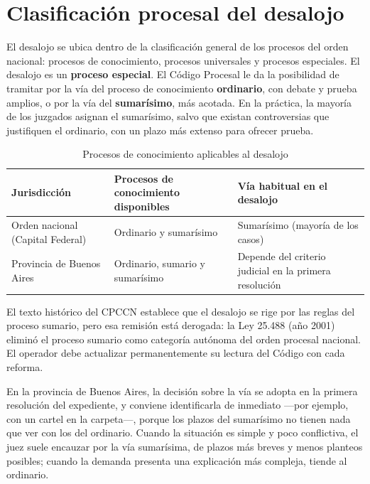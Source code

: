 \documentclass[12pt,oneside]{book}
\begin{document}
\section{Clasificación procesal del desalojo}

El desalojo se ubica dentro de la clasificación general de los procesos del orden nacional: procesos de conocimiento, procesos universales y procesos especiales. El desalojo es un \textbf{proceso especial}. El Código Procesal le da la posibilidad de tramitar por la vía del proceso de conocimiento \textbf{ordinario}, con debate y prueba amplios, o por la vía del \textbf{sumarísimo}, más acotada. En la práctica, la mayoría de los juzgados asignan el sumarísimo, salvo que existan controversias que justifiquen el ordinario, con un plazo más extenso para ofrecer prueba.

\begin{table}[H]
\centering
\caption{Procesos de conocimiento aplicables al desalojo}
\begin{tabularx}{\textwidth}{>{\raggedright\arraybackslash}X >{\raggedright\arraybackslash}X >{\raggedright\arraybackslash}X}
\toprule
\textbf{Jurisdicción} & \textbf{Procesos de conocimiento disponibles} & \textbf{Vía habitual en el desalojo} \\
\midrule
Orden nacional (Capital Federal) & Ordinario y sumarísimo & Sumarísimo (mayoría de los casos) \\
Provincia de Buenos Aires & Ordinario, sumario y sumarísimo & Depende del criterio judicial en la primera resolución \\
\bottomrule
\end{tabularx}
\end{table}

\begin{important}
El texto histórico del CPCCN establece que el desalojo se rige por las reglas del proceso sumario, pero esa remisión está derogada: la Ley 25.488 (año 2001) eliminó el proceso sumario como categoría autónoma del orden procesal nacional. El operador debe actualizar permanentemente su lectura del Código con cada reforma.
\end{important}

En la provincia de Buenos Aires, la decisión sobre la vía se adopta en la primera resolución del expediente, y conviene identificarla de inmediato ---por ejemplo, con un cartel en la carpeta---, porque los plazos del sumarísimo no tienen nada que ver con los del ordinario. Cuando la situación es simple y poco conflictiva, el juez suele encauzar por la vía sumarísima, de plazos más breves y menos planteos posibles; cuando la demanda presenta una explicación más compleja, tiende al ordinario.
\end{document}
